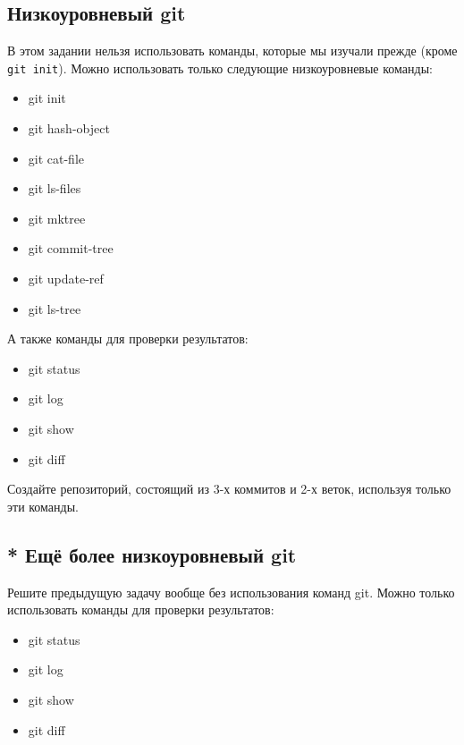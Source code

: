 \documentclass{article}
\begin{document}
\subsection*{Низкоуровневый git}
В этом задании нельзя использовать команды, которые мы изучали прежде (кроме \texttt{git init}). Можно использовать только следующие низкоуровневые команды:
\begin{itemize}
\item git init
\item git hash-object
\item git cat-file
\item git ls-files
\item git mktree
\item git commit-tree
\item git update-ref 
\item git ls-tree
\end{itemize}
А также команды для проверки результатов:
\begin{itemize}
\item git status
\item git log
\item git show
\item git diff
\end{itemize}
Создайте репозиторий, состоящий из 3-х коммитов и 2-х веток, используя только эти команды.

\subsection*{* Ещё более низкоуровневый git}
Решите предыдущую задачу вообще без использования команд git. Можно только использовать команды для проверки результатов:
\begin{itemize}
\item git status
\item git log
\item git show
\item git diff
\end{itemize}
\end{document}
